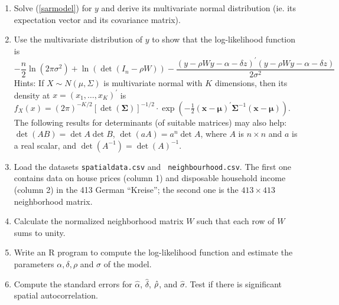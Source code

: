 \documentclass{article}
\begin{document}
\begin{enumerate}
\item Solve (\ref{sarmodel}) for $y$ and derive its multivariate normal
distribution (ie. its expectation vector and its covariance matrix).

\item Use the multivariate distribution of $y$ to show that the
log-likelihood function is%
\begin{equation*}
-\frac{n}{2}\ln \left( 2\pi \sigma ^{2}\right) +\ln \left( \det \left(
I_{n}-\rho W\right) \right) -\frac{\left( y-\rho Wy-\alpha -\delta z\right)
^{\prime }\left( y-\rho Wy-\alpha -\delta z\right) }{2\sigma ^{2}}
\end{equation*}%
Hints: If $X\sim N\left( \mu ,\Sigma \right) $ is multivariate normal with $%
K $ dimensions, then its density at $x=(x_{1},\ldots ,x_{K})^{\prime }$ is $%
f_{X}\left( x\right) =(2\pi )^{-K/2}\left[ \det (\mathbf{\Sigma })\right]
^{-1/2}\cdot \exp \left( -\frac{1}{2}\left( \mathbf{x}-\mathbf{\mu }\right)
^{\prime }\mathbf{\Sigma }^{-1}\left( \mathbf{x}-\mathbf{\mu }\right)
\right) $. The following results for determinants (of suitable matrices) may
also help: $\det \left( AB\right) =\det A\det B$, $\det (aA)=a^{n}\det A$,
where $A$ is $n\times n$ and $a$ is a real scalar, and $\det (A^{-1})=\det
(A)^{-1}$.

\item Load the datasets \texttt{spatialdata.csv} and \texttt{%
neighbourhood.csv}. The first one contains data on house prices (column 1)
and disposable household income (column 2) in the 413 German
\textquotedblleft Kreise\textquotedblright ; the second one is the $%
413\times 413$ neighborhood matrix.

\item Calculate the normalized neighborhood matrix $W$ such that each row of
$W$ sums to unity.

\item Write an R program to compute the log-likelihood function and estimate
the parameters $\alpha ,\delta ,\rho $ and $\sigma $ of the model.

\item Compute the standard errors for $\hat{\alpha}$, $\hat{\delta}$, $\hat{%
\rho}$, and $\hat{\sigma}$. Test if there is significant spatial
autocorrelation.
\end{enumerate}
\end{document}
